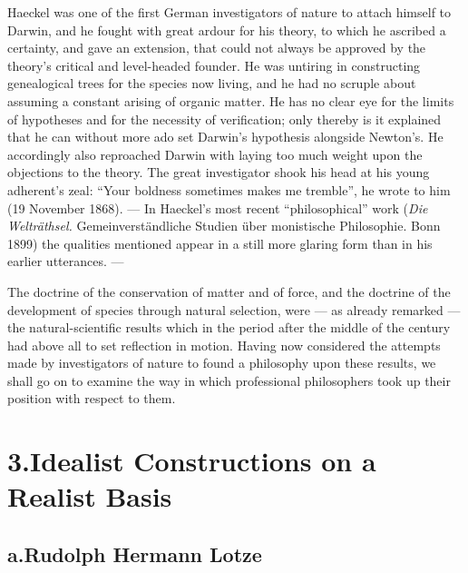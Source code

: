 \documentclass[12pt,a4paper]{book}
\newcommand{\opage}[1]{\marginnote{\footnotesize\textit{[#1]}}}
\begin{document}
Haeckel was one of the first German investigators of nature to attach himself to
Darwin, and he fought with great ardour for his theory, to which he ascribed a
certainty, and gave an extension, that could not always be approved by the
theory's critical and level-headed founder. He was untiring in constructing
genealogical trees for the species now living, and he had no scruple about
assuming a constant arising of organic matter. He has no clear eye for the
limits of hypotheses and for the necessity of verification; only thereby is it
explained that he can without more ado set Darwin's hypothesis alongside
Newton's. He accordingly also reproached Darwin with laying too much weight upon
the objections to the theory. The great investigator shook his head at his young
adherent's zeal: ``Your boldness sometimes makes me tremble'', he wrote to him
(19 November 1868). --- In Haeckel's most recent ``philosophical'' work
(\textit{Die Welträthsel.} Gemeinverständliche Studien über monistische
Philosophie. Bonn 1899) the qualities mentioned appear in a still more glaring
form than in his earlier utterances. ---

The doctrine of the conservation of matter and of force, and the doctrine of the
development of species through natural selection, were --- as already remarked
--- the natural-scientific results which in the period after the middle of the
century had above all to set \opage{509}reflection in motion. Having now considered the
attempts made by investigators of nature to found a philosophy upon these
results, we shall go on to examine the way in which professional philosophers
took up their position with respect to them.

\section*{3.\quad Idealist Constructions on a Realist Basis}
\label{sec:idealistiske}

\subsection*{a.\quad Rudolph Hermann Lotze}
\end{document}
